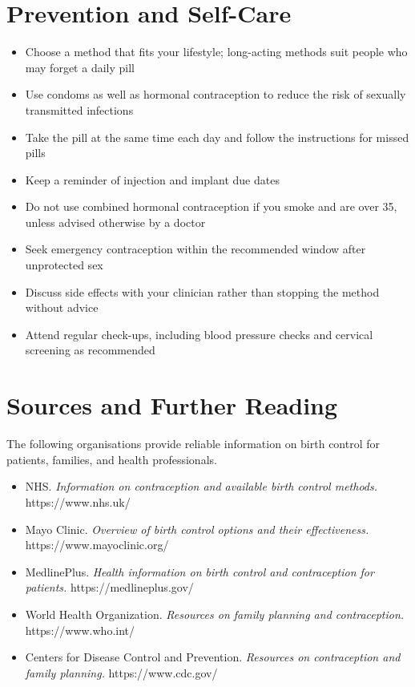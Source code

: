 \section*{Prevention and Self-Care}
\begin{itemize}
    \item Choose a method that fits your lifestyle; long-acting methods suit people who may forget a daily pill
    \item Use condoms as well as hormonal contraception to reduce the risk of sexually transmitted infections
    \item Take the pill at the same time each day and follow the instructions for missed pills
    \item Keep a reminder of injection and implant due dates
    \item Do not use combined hormonal contraception if you smoke and are over 35, unless advised otherwise by a doctor
    \item Seek emergency contraception within the recommended window after unprotected sex
    \item Discuss side effects with your clinician rather than stopping the method without advice
    \item Attend regular check-ups, including blood pressure checks and cervical screening as recommended
\end{itemize}

\section*{Sources and Further Reading}
The following organisations provide reliable information on birth control for patients, families, and health professionals.

\begin{itemize}
    \item NHS. \textit{Information on contraception and available birth control methods.} https://www.nhs.uk/
    \item Mayo Clinic. \textit{Overview of birth control options and their effectiveness.} https://www.mayoclinic.org/
    \item MedlinePlus. \textit{Health information on birth control and contraception for patients.} https://medlineplus.gov/
    \item World Health Organization. \textit{Resources on family planning and contraception.} https://www.who.int/
    \item Centers for Disease Control and Prevention. \textit{Resources on contraception and family planning.} https://www.cdc.gov/
\end{itemize}
